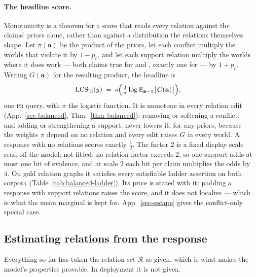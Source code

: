 \paragraph{The headline score.} Monotonicity is a theorem for a score that reads every relation against the
claims' priors alone, rather than against a distribution the relations themselves shape. Let $\pi(\mathbf{a})$ be
the product of the priors, let each conflict multiply the worlds that violate it by $1-p_r$, and let each support
relation multiply the worlds where it does work --- both claims true for \ent{} and \eqv{}, exactly one for \cnc{}
--- by $1+p_r$. Writing $G(\mathbf{a})$ for the resulting product, the headline is
\begin{equation}
\mathrm{LCS}_{\mathrm{bl}}(y)\;=\;\sigma\!\Bigl(\tfrac{2}{n}\log\mathbb{E}_{\mathbf{a}\sim\pi}\bigl[G(\mathbf{a})\bigr]\Bigr),
\label{eq-balanced-main}
\end{equation}
one \textsc{pr} query, with $\sigma$ the logistic function. It is monotone in every relation edit
(App.~\ref{sec-balanced}, Thm.~\ref{thm-balanced}): removing or softening a conflict, and adding or strengthening a
support, never lowers it, for any priors, because the weights $\pi$ depend on no relation and every edit raises $G$
in every world. A response with no relations scores exactly $\tfrac12$. The factor $2$ is a fixed display scale
read off the model, not fitted: no relation factor exceeds $2$, so one support adds at most one bit of evidence, and
at scale $2$ each bit per claim multiplies the odds by $4$. On gold relation graphs it satisfies every satisfiable
ladder assertion on both corpora (Table~\ref{tab:balanced-ladder}). Its price is stated with it: padding a response
with support relations raises the score, and it does not localize --- which is what the mean marginal is kept
for. App.~\ref{sec-escape} gives the conflict-only special case.

\subsection{Estimating relations from the response}
\label{sec-mining}

Everything so far has taken the relation set $\mathcal{R}$ as given, which is what makes the model's properties
provable. In deployment it is not given.

